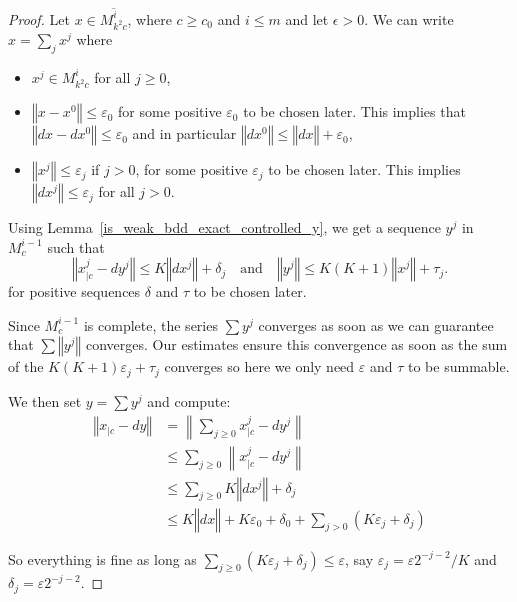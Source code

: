 \begin{proof}
Let $x \in \overline{M^i_{k^2c}}$, where $c \geq c_0$ and $i \leq m$ and let $\epsilon > 0$.
We can write $x = \sum_j x^j$ where
\begin{itemize}
 \item $x^j \in M^i_{k^2c}$ for all $j \geq 0$,
 \item $‖x - x^0‖ ≤ ε_0$ for some positive $ε_0$ to be chosen later. This implies that $‖dx - dx^0‖ ≤ ε_0$ and
   in particular $‖dx^0‖ ≤ ‖dx‖ + ε_0$,
 \item $‖x^j‖ ≤ ε_j$ if $j > 0$, for some positive $ε_j$ to be chosen later. This implies $‖dx^j‖ ≤ ε_j$
   for all $j > 0$.
\end{itemize}

Using Lemma~\ref{is_weak_bdd_exact_controlled_y}, we get a sequence $y^j$ in $M^{i-1}_c$ such that
  \[
    ‖x^j_{|c} - dy^j‖ ≤  K ‖dx^j‖ + δ_j
    \quad \text{and} \quad
    ‖y^j‖ ≤ K(K + 1)‖x^j‖ + τ_j.
  \]
for positive sequences $δ$ and $τ$ to be chosen later.

Since $M^{i-1}_c$ is complete, the series $\sum y^j$ converges as soon as we can guarantee that
$\sum ‖y^j‖$ converges. Our estimates ensure this convergence as soon as the
sum of the $K(K + 1)ε_j + τ_j$ converges so here we only need $ε$ and $τ$ to be
summable.

We then set $y = ∑ y^j$ and compute:
\begin{align*}
  ‖x_{|c} - dy‖ &= \left\|∑_{j ≥ 0} x^j_{|c} - dy^j\right\| \\
    &≤ ∑_{j ≥ 0} \left\|x^j_{|c} - dy^j\right\| \\
    &≤ ∑_{j ≥ 0} K‖dx^j‖ + δ_j \\
    &≤ K‖dx‖ + Kε_0 + δ_0 +  ∑_{j > 0} (Kε_j + δ_j)
\end{align*}

So everything is fine as long as $∑_{j ≥ 0} (Kε_j + δ_j) ≤ ε$, say $ε_j = ε2^{-j-2}/K$ and $δ_j = ε2^{-j-2}$.
\end{proof}

